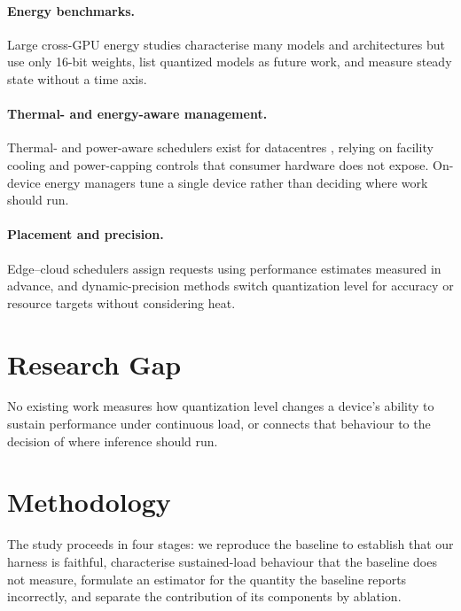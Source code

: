 \documentclass[11pt,a4paper]{article}
\begin{document}
\paragraph{Energy benchmarks.} Large cross-GPU energy studies
\cite{fadelargerich2026wattcounts} characterise many models and architectures but
use only 16-bit weights, list quantized models as future work, and measure
steady state without a time axis.

\paragraph{Thermal- and energy-aware management.} Thermal- and power-aware
schedulers exist for datacentres \cite{stojkovic2025tapas}, relying on facility
cooling and power-capping controls that consumer hardware does not expose.
On-device energy managers \cite{zou2026enerinfer} tune a single device rather than
deciding where work should run.

\paragraph{Placement and precision.} Edge--cloud schedulers
\cite{yang2024perllm} assign requests using performance estimates measured in
advance, and dynamic-precision methods \cite{liu2025flexquant} switch quantization
level for accuracy or resource targets without considering heat.

\section{Research Gap}
No existing work measures how quantization level changes a device's ability to
sustain performance under continuous load, or connects that behaviour to the
decision of where inference should run.

\section{Methodology}

The study proceeds in four stages: we reproduce the baseline to establish that
our harness is faithful, characterise sustained-load behaviour that the baseline
does not measure, formulate an estimator for the quantity the baseline reports
incorrectly, and separate the contribution of its components by ablation.
\end{document}
